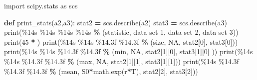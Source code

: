 \documentclass[
]{book}
\newenvironment{Shaded}{\begin{snugshade}}{\end{snugshade}}
\newcommand{\BuiltInTok}[1]{#1}
\newcommand{\DecValTok}[1]{\textcolor[rgb]{0.00,0.00,0.81}{#1}}
\newcommand{\ImportTok}[1]{#1}
\newcommand{\KeywordTok}[1]{\textcolor[rgb]{0.13,0.29,0.53}{\textbf{#1}}}
\newcommand{\NormalTok}[1]{#1}
\newcommand{\OperatorTok}[1]{\textcolor[rgb]{0.81,0.36,0.00}{\textbf{#1}}}
\newcommand{\SpecialCharTok}[1]{\textcolor[rgb]{0.00,0.00,0.00}{#1}}
\newcommand{\StringTok}[1]{\textcolor[rgb]{0.31,0.60,0.02}{#1}}
\begin{document}
\begin{Shaded}
\begin{Highlighting}[]
\ImportTok{import}\NormalTok{ scipy.stats  }\ImportTok{as}\NormalTok{ scs}

\KeywordTok{def}\NormalTok{ print\_stats(a2,a3):}
\NormalTok{    stat2 }\OperatorTok{=}\NormalTok{ scs.describe(a2)}
\NormalTok{    stat3 }\OperatorTok{=}\NormalTok{ scs.describe(a3)}
    \BuiltInTok{print}\NormalTok{(}\StringTok{\textquotesingle{}}\SpecialCharTok{\%14s}\StringTok{ }\SpecialCharTok{\%14s}\StringTok{ }\SpecialCharTok{\%14s}\StringTok{ }\SpecialCharTok{\%14s}\StringTok{\textquotesingle{}} \OperatorTok{\%}\NormalTok{ (}\StringTok{\textquotesingle{}statistic\textquotesingle{}}\NormalTok{, }\StringTok{\textquotesingle{}data set 1\textquotesingle{}}\NormalTok{, }\StringTok{\textquotesingle{}data set 2\textquotesingle{}}\NormalTok{, }\StringTok{\textquotesingle{}data set 3\textquotesingle{}}\NormalTok{))}
    \BuiltInTok{print}\NormalTok{(}\DecValTok{45} \OperatorTok{*} \StringTok{\textquotesingle{}{-}\textquotesingle{}}\NormalTok{)}
    \BuiltInTok{print}\NormalTok{(}\StringTok{\textquotesingle{}}\SpecialCharTok{\%14s}\StringTok{ }\SpecialCharTok{\%14s}\StringTok{ }\SpecialCharTok{\%14.3f}\StringTok{ }\SpecialCharTok{\%14.3f}\StringTok{\textquotesingle{}} \OperatorTok{\%}\NormalTok{ (}\StringTok{\textquotesingle{}size\textquotesingle{}}\NormalTok{, }\StringTok{\textquotesingle{}NA\textquotesingle{}}\NormalTok{, stat2[}\DecValTok{0}\NormalTok{], stat3[}\DecValTok{0}\NormalTok{]))}
    \BuiltInTok{print}\NormalTok{(}\StringTok{\textquotesingle{}}\SpecialCharTok{\%14s}\StringTok{ }\SpecialCharTok{\%14s}\StringTok{ }\SpecialCharTok{\%14.3f}\StringTok{ }\SpecialCharTok{\%14.3f}\StringTok{\textquotesingle{}} \OperatorTok{\%}\NormalTok{ (}\StringTok{\textquotesingle{}min\textquotesingle{}}\NormalTok{, }\StringTok{\textquotesingle{}NA\textquotesingle{}}\NormalTok{, stat2[}\DecValTok{1}\NormalTok{][}\DecValTok{0}\NormalTok{], stat3[}\DecValTok{1}\NormalTok{][}\DecValTok{0}\NormalTok{] ))}
    \BuiltInTok{print}\NormalTok{(}\StringTok{\textquotesingle{}}\SpecialCharTok{\%14s}\StringTok{ }\SpecialCharTok{\%14s}\StringTok{ }\SpecialCharTok{\%14.3f}\StringTok{ }\SpecialCharTok{\%14.3f}\StringTok{\textquotesingle{}} \OperatorTok{\%}\NormalTok{ (}\StringTok{\textquotesingle{}max\textquotesingle{}}\NormalTok{, }\StringTok{\textquotesingle{}NA\textquotesingle{}}\NormalTok{, stat2[}\DecValTok{1}\NormalTok{][}\DecValTok{1}\NormalTok{], stat3[}\DecValTok{1}\NormalTok{][}\DecValTok{1}\NormalTok{]))}
    \BuiltInTok{print}\NormalTok{(}\StringTok{\textquotesingle{}}\SpecialCharTok{\%14s}\StringTok{ }\SpecialCharTok{\%14.3f}\StringTok{ }\SpecialCharTok{\%14.3f}\StringTok{ }\SpecialCharTok{\%14.3f}\StringTok{\textquotesingle{}} \OperatorTok{\%}\NormalTok{ (}\StringTok{\textquotesingle{}mean\textquotesingle{}}\NormalTok{, S0}\OperatorTok{*}\NormalTok{math.exp(r}\OperatorTok{*}\NormalTok{T), stat2[}\DecValTok{2}\NormalTok{], stat3[}\DecValTok{2}\NormalTok{]))}

\end{Highlighting}
\end{Shaded}
\end{document}
